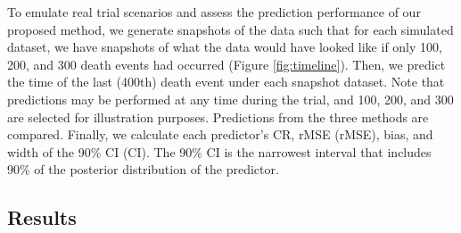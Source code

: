 To emulate real trial scenarios and assess the prediction performance of our proposed method, we generate snapshots of the data such that for each simulated dataset, we have snapshots of what the data would have looked like if only 100, 200, and 300 death events had occurred (Figure \ref{fig:timeline}). Then, we predict the time of the last (400th) death event under each snapshot dataset. Note that predictions may be performed at any time during the trial, and 100, 200, and 300 are selected for illustration purposes. Predictions from the three methods are compared. Finally, we calculate each predictor's \ac{CR}, \acl{rMSE} (\acs{rMSE}), bias, and width of the 90\% \acl{CI} (\acs{CI}). The 90\% \ac{CI} is the narrowest interval that includes 90\% of the posterior distribution of the predictor. 

\subsection{Results}

